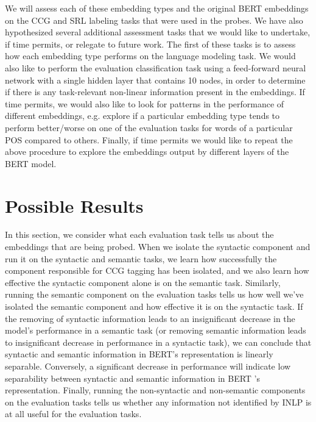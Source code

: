 \documentclass[11pt,a4paper]{article}
\begin{document}
We will assess each of these embedding types and the original BERT embeddings on the CCG and SRL labeling tasks that were used in the probes. We have also hypothesized several additional assessment tasks that we would like to undertake, if time permits, or relegate to future work. The first of these tasks is to assess how each embedding type performs on the language modeling task. We would also like to perform the evaluation classification task using a feed-forward neural network with a single hidden layer that contains 10 nodes, in order to determine if there is any task-relevant non-linear information present in the embeddings. If time permits, we would also like to look for patterns in the performance of different embeddings, e.g. explore if a particular embedding type tends to perform better/worse on one of the evaluation tasks for words of a particular POS compared to others. Finally, if time permits we would like to repeat the above procedure to explore the embeddings output by different layers of the BERT model. 




\section{Possible Results}
\label{sec:result}

In this section, we consider what each evaluation task tells us about the embeddings that are being probed. When we isolate the syntactic component and run it on the syntactic and semantic tasks, we learn how successfully the component responsible for CCG tagging has been isolated, and we also learn how effective the syntactic component alone is on the semantic task. Similarly, running the semantic component on the evaluation tasks tells us how well we've isolated the semantic component and how effective it is on the syntactic task. If the removing of syntactic information leads to an insignificant decrease in the model\rq s performance in a semantic task (or removing semantic information leads to insignificant decrease in performance in a syntactic task), we can conclude that syntactic and semantic information in BERT\rq s representation is linearly separable. Conversely, a significant decrease in performance will indicate low separability between syntactic and semantic information in BERT \rq s representation. Finally, running the non-syntactic and non-semantic components on the evaluation tasks tells us whether any information not identified by INLP is at all useful for the evaluation tasks.
\end{document}
